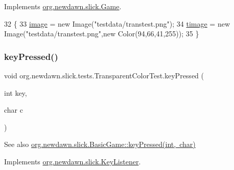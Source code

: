 Implements \mbox{\hyperlink{interfaceorg_1_1newdawn_1_1slick_1_1_game_ad2dd6affab08bb8fdb5fab0815957b7a}{org.\+newdawn.\+slick.\+Game}}.


\begin{DoxyCode}
32                                                                     \{
33         \mbox{\hyperlink{classorg_1_1newdawn_1_1slick_1_1tests_1_1_transparent_color_test_a4604f1b98ff0397381e1a18b3f50ec9d}{image}} = \textcolor{keyword}{new} Image(\textcolor{stringliteral}{"testdata/transtest.png"});
34         \mbox{\hyperlink{classorg_1_1newdawn_1_1slick_1_1tests_1_1_transparent_color_test_ac3344321755a8261d1a2eb28fb5816e0}{timage}} = \textcolor{keyword}{new} Image(\textcolor{stringliteral}{"testdata/transtest.png"},\textcolor{keyword}{new} Color(94,66,41,255));
35     \}
\end{DoxyCode}
\mbox{\label{classorg_1_1newdawn_1_1slick_1_1tests_1_1_transparent_color_test_a73793b65ffa6ebcc6309b8d169ccaa04}} 
\subsubsection{\texorpdfstring{key\+Pressed()}{keyPressed()}}
{\footnotesize\ttfamily void org.\+newdawn.\+slick.\+tests.\+Transparent\+Color\+Test.\+key\+Pressed (\begin{DoxyParamCaption}\item[{int}]{key,  }\item[{char}]{c }\end{DoxyParamCaption})\hspace{0.3cm}{\ttfamily [inline]}}

\begin{DoxySeeAlso}{See also}
\mbox{\hyperlink{classorg_1_1newdawn_1_1slick_1_1_basic_game_a4fbb3345b5abf5ddd54a99466d07f02f}{org.\+newdawn.\+slick.\+Basic\+Game\+::key\+Pressed(int, char)}} 
\end{DoxySeeAlso}


Implements \mbox{\hyperlink{interfaceorg_1_1newdawn_1_1slick_1_1_key_listener_ac0b0568a21ef486c4f51382614c196ef}{org.\+newdawn.\+slick.\+Key\+Listener}}.


